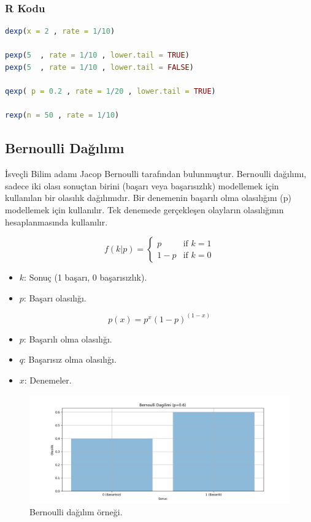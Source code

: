 \subsubsection{R Kodu}

\begin{lstlisting}[language=R]
dexp(x = 2 , rate = 1/10)

pexp(5  , rate = 1/10 , lower.tail = TRUE)
pexp(5  , rate = 1/10 , lower.tail = FALSE)

qexp( p = 0.2 , rate = 1/20 , lower.tail = TRUE)

rexp(n = 50 , rate = 1/10)
\end{lstlisting}

\newpage

\subsection{Bernoulli Dağılımı}
İsveçli Bilim adamı Jacop Bernoulli tarafından bulunmuştur. Bernoulli dağılımı, sadece iki olası sonuçtan birini (başarı veya başarısızlık) modellemek için kullanılan bir olasılık dağılımıdır. Bir denemenin başarılı olma olasılığını (p) modellemek için kullanılır. Tek denemede gerçekleşen olayların olasılığının hesaplanmasında kullanılır.

\[f(k|p) = \begin{cases} p & \text{if } k = 1 \\ 1 - p & \text{if } k = 0 \end{cases}\]
\begin{itemize}
	\item $k$: Sonuç (1 başarı, 0 başarısızlık).
	\item $p$: Başarı olasılığı.
\end{itemize}

\[
p(x) = p^x (1 - p)^(1- x)
\]

\begin{itemize}
	\item $p$: Başarılı olma olasılığı.
	\item $q$: Başarısız olma olasılığı.
	\item $x$: Denemeler.
\end{itemize}

\begin{figure}[h]
    \centering
    \includegraphics[width=1\textwidth]{images/bernoulli_distribution.png}
    \caption{Bernoulli dağılım örneği.}
    \label{fig:enter-label}
\end{figure}


